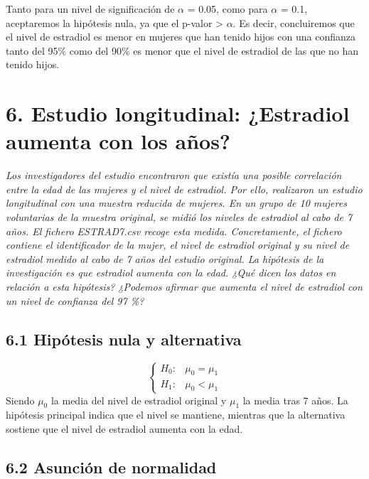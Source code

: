 \documentclass[
]{article}
\begin{document}
Tanto para un nivel de significación de \(\alpha\) = 0.05, como para
\(\alpha\) = 0.1, aceptaremos la hipótesis nula, ya que el p-valor
\textgreater{} \(\alpha\). Es decir, concluiremos que el nivel de
estradiol es menor en mujeres que han tenido hijos con una confianza
tanto del 95\% como del 90\% es menor que el nivel de estradiol de las
que no han tenido hijos.

\hypertarget{p6}{%
\section{6. Estudio longitudinal: ¿Estradiol aumenta con los
años?}\label{p6}}

\emph{Los investigadores del estudio encontraron que existía una posible
correlación entre la edad de las mujeres y el nivel de estradiol. Por
ello, realizaron un estudio longitudinal con una muestra reducida de
mujeres. En un grupo de 10 mujeres voluntarias de la muestra original,
se midió los niveles de estradiol al cabo de 7 años. El fichero
ESTRAD7.csv recoge esta medida. Concretamente, el fichero contiene el
identificador de la mujer, el nivel de estradiol original y su nivel de
estradiol medido al cabo de 7 años del estudio original. La hipótesis de
la investigación es que estradiol aumenta con la edad. ¿Qué dicen los
datos en relación a esta hipótesis? ¿Podemos afirmar que aumenta el
nivel de estradiol con un nivel de confianza del 97 \%?}

\hypertarget{hipuxf3tesis-nula-y-alternativa-3}{%
\subsection{6.1 Hipótesis nula y
alternativa}\label{hipuxf3tesis-nula-y-alternativa-3}}

\[
\left\{
  \begin{array}{ll}
    H_{0}: &  \mu_{0} = \mu_{1}\\
    H_{1}: & \mu_{0} < \mu_{1}
  \end{array}
\right.
\] Siendo \(\mu_0\) la media del nivel de estradiol original y \(\mu_1\)
la media tras 7 años. La hipótesis principal indica que el nivel se
mantiene, mientras que la alternativa sostiene que el nivel de estradiol
aumenta con la edad.

\hypertarget{asunciuxf3n-de-normalidad}{%
\subsection{6.2 Asunción de
normalidad}\label{asunciuxf3n-de-normalidad}}
\end{document}
